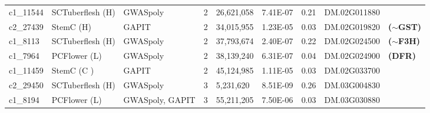 \documentclass[pdflatex,sn-mathphys-ay]{sn-jnl}%
\begin{document}
\begin{landscape}
\begin{table}[ht]
\begin{tabular}{lllllllll}
c1\_11544                        & SCTuberflesh (H)                        & GWASpoly                        & 2                        & 26,621,058                        & 7.41E-07                        & 0.21                        & DM.02G011880                        &                                                                              \\
\rowcolor[HTML]{FFFFD7} 
c2\_27439                        & StemC (H)                               & GAPIT                           & 2                        & 34,015,955                        & 1.23E-05                        & 0.03                        & DM.02G019820                        & \textbf{($\sim$GST)}\citep{riveros2022uncovering}                                          \\
\rowcolor[HTML]{FFFFD7} 
c1\_8113                         & SCTuberflesh (H)                        & GWASpoly                        & 2                        & 37,793,674                        & 2.40E-07                        & 0.22                        & DM.02G024500                        & \textbf{($\sim$F3H)}\citep{riveros2022uncovering}                                          \\
\rowcolor[HTML]{DDE8CB} 
c1\_7964                         & PCFlower (L)                            & GWASpoly                        & 2                        & 38,139,240                        & 6.31E-07                        & 0.04                        & DM.02G024900                        & \textbf{(DFR)}\citep{riveros2022uncovering}                                          \\
\rowcolor[HTML]{FFFFD7} 
c1\_11459                        & StemC (C )                              & GAPIT                           & 2                        & 45,124,985                        & 1.11E-05                        & 0.03                        & DM.02G033700                        & \citep{sharma2024genotyping,berdugo2023phenotypic,Berdugo2017}\\
c2\_29450                        & SCTuberflesh (H)                        & GWASpoly                        & 3                        & 5,231,620                         & 8.51E-09                        & 0.26                        & DM.03G004830                        &                                                                              \\
\rowcolor[HTML]{FFFFD7} 
c1\_8194                         & PCFlower (L)                            & GWASpoly, GAPIT                 & 3                        & 55,211,205                        & 7.50E-06                        & 0.03                        & DM.03G030880                        & \citep{pandey2022genomic}                                                        \\

\end{tabular}
\end{table}
\end{landscape}
\end{document}
